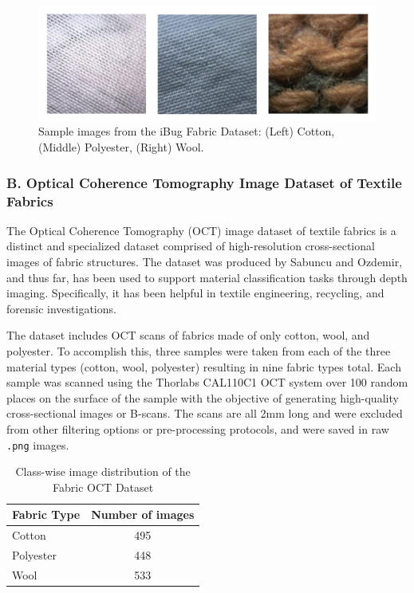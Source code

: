 \begin{figure}[H]
    \centering
    \begin{minipage}{0.8\linewidth}
        \includegraphics[width=\linewidth]{images/iBugDataset}
    \end{minipage}
    \caption[Sample images from the iBug Fabric Dataset]{Sample images from the iBug Fabric Dataset: (Left) Cotton, (Middle) Polyester, (Right) Wool.}
\end{figure}

\subsubsection{B. Optical Coherence Tomography Image Dataset of Textile Fabrics~\cite{sabuncu2022optical}}

The Optical Coherence Tomography (OCT) image dataset of textile fabrics is a distinct and specialized dataset comprised of high-resolution cross-sectional images of fabric structures. The dataset was produced by Sabuncu and Ozdemir, and thus far, has been used to support material classification tasks through depth imaging. Specifically, it has been helpful in textile engineering, recycling, and forensic investigations. 

The dataset includes OCT scans of fabrics made of only cotton, wool, and polyester. To accomplish this, three samples were taken from each of the three material types (cotton, wool, polyester) resulting in nine fabric types total. Each sample was scanned using the Thorlabs CAL110C1 OCT system over 100 random places on the surface of the sample with the objective of generating high-quality cross-sectional images or B-scans. The scans are all 2mm long and were excluded from other filtering options or pre-processing protocols, and were saved in raw \texttt{.png} images.

\begin{table}[H]
\centering
\caption{Class-wise image distribution of the Fabric OCT Dataset}
\begin{tabular}{|l|c|}
\hline
\textbf{Fabric Type} & \textbf{Number of images} \\
\hline
Cotton & 495 \\
Polyester & 448 \\
Wool & 533 \\
\hline
\end{tabular}
\end{table}

